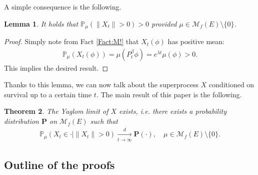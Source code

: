 \documentclass[12pt,a4paper]{amsart}
\numberwithin{equation}{section}
\theoremstyle{plain}
\newtheorem{thm}{Theorem}[section]
\newtheorem{lem}[thm]{Lemma}
\theoremstyle{definition}
\theoremstyle{remark}
\begin{document}
A simple consequence is the following.
\begin{lem} \label{Lemma:Nd!} 
It holds that $\mathbb P_\mu(\|X_t\| > 0) > 0$ provided $\mu \in \mathcal M_f(E)\setminus \{0\}$.
\end{lem}
\begin{proof}
Simply note from Fact \ref{Fact:M!} that $X_t(\phi)$ has positive mean:
\begin{align}
\mathbb P_\mu(X_t(\phi)) 
= \mu(P_t^\beta \phi) 
=e^{\lambda t}\mu(\phi)>0.
\end{align}
This implies the desired result.
\end{proof}
Thanks to this lemma, we can now talk about the superprocess $X$ conditioned on survival up to a certain time $t$. 
The main result of this paper is the following.
\begin{thm} \label{Theorem:Y:H1:H2:H3:H4} 
The Yaglom limit of $X$ exists, i.e. there exists a probability distribution $\mathbf P$ on $\mathcal M_f(E)$ such that 
\begin{align}
 \mathbb P_\mu (X_t \in \cdot | \|X_t\|> 0 ) 
 \xrightarrow[t\to \infty]{d} \mathbf P(\cdot), 
 \quad \mu \in \mathcal M_f(E)\setminus \{0\}.
 \end{align}
\end {thm}
\subsection{Outline of the proofs}
\end{document}
